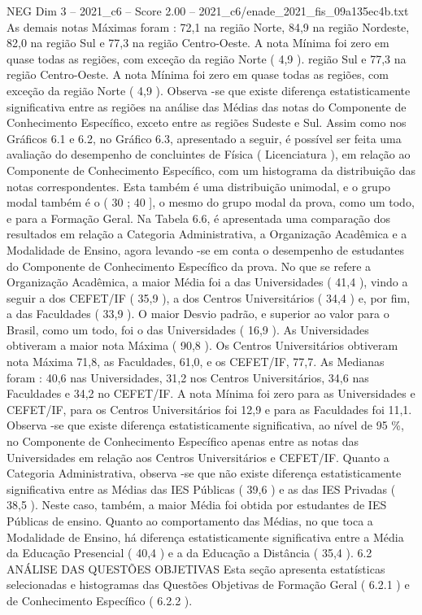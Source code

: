 \begin{textsample}{NEG Dim 3 – 2021\_c6 – Score 2.00 – 2021\_c6/enade\_2021\_fis\_09a135ec4b.txt}
As demais notas Máximas foram : 72,1 na região Norte, 84,9 na região Nordeste, 82,0 na região Sul e 77,3 na região Centro-Oeste.
A nota Mínima foi zero em quase todas as regiões, com exceção da região Norte ( 4,9 ). região Sul e 77,3 na região Centro-Oeste.
A nota Mínima foi zero em quase todas as regiões, com exceção da região Norte ( 4,9 ).
Observa -se que existe diferença estatisticamente significativa entre as regiões na análise das Médias das notas do Componente de Conhecimento Específico, exceto entre as regiões Sudeste e Sul.
Assim como nos Gráficos 6.1 e 6.2, no Gráfico 6.3, apresentado a seguir, é possível ser feita uma avaliação do desempenho de concluintes de Física ( Licenciatura ), em relação ao Componente de Conhecimento Específico, com um histograma da distribuição das notas correspondentes.
Esta também é uma distribuição unimodal, e o grupo modal também é o ( 30 ; 40 ], o mesmo do grupo modal da prova, como um todo, e para a Formação Geral.
Na Tabela 6.6, é apresentada uma comparação dos resultados em relação a Categoria Administrativa, a Organização Acadêmica e a Modalidade de Ensino, agora levando -se em conta o desempenho de estudantes do Componente de Conhecimento Específico da prova.
No que se refere a Organização Acadêmica, a maior Média foi a das Universidades ( 41,4 ), vindo a seguir a dos CEFET/IF ( 35,9 ), a dos Centros Universitários ( 34,4 ) e, por fim, a das Faculdades ( 33,9 ).
O maior Desvio padrão, e superior ao valor para o Brasil, como um todo, foi o das Universidades ( 16,9 ).
As Universidades obtiveram a maior nota Máxima ( 90,8 ).
Os Centros Universitários obtiveram nota Máxima 71,8, as Faculdades, 61,0, e os CEFET/IF, 77,7.
As Medianas foram : 40,6 nas Universidades, 31,2 nos Centros Universitários, 34,6 nas Faculdades e 34,2 no CEFET/IF.
A nota Mínima foi zero para as Universidades e CEFET/IF, para os Centros Universitários foi 12,9 e para as Faculdades foi 11,1.
Observa -se que existe diferença estatisticamente significativa, ao nível de 95 \%, no Componente de Conhecimento Específico apenas entre as notas das Universidades em relação aos Centros Universitários e CEFET/IF.
Quanto a Categoria Administrativa, observa -se que não existe diferença estatisticamente significativa entre as Médias das IES Públicas ( 39,6 ) e as das IES Privadas ( 38,5 ).
Neste caso, também, a maior Média foi obtida por estudantes de IES Públicas de ensino.
Quanto ao comportamento das Médias, no que toca a Modalidade de Ensino, há diferença estatisticamente significativa entre a Média da Educação Presencial ( 40,4 ) e a da Educação a Distância ( 35,4 ). 6.2 ANÁLISE DAS QUESTÕES OBJETIVAS Esta seção apresenta estatísticas selecionadas e histogramas das Questões Objetivas de Formação Geral ( 6.2.1 ) e de Conhecimento Específico ( 6.2.2 ).

\end{textsample}
